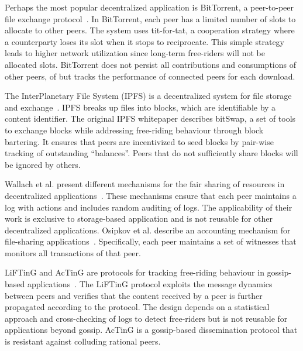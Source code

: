 Perhaps the most popular decentralized application is BitTorrent, a peer-to-peer file exchange protocol~\cite{cohen2003incentives}.
In BitTorrent, each peer has a limited number of slots to allocate to other peers.
The system uses tit-for-tat, a cooperation strategy where a counterparty loses its slot when it stops to reciprocate.
This simple strategy leads to higher network utilization since long-term free-riders will not be allocated slots.
BitTorrent does not persist all contributions and consumptions of other peers, of but tracks the performance of connected peers for each download.

The InterPlanetary File System (IPFS) is a decentralized system for file storage and exchange~\cite{benet2014ipfs}.
IPFS breaks up files into blocks, which are identifiable by a content identifier.
The original IPFS whitepaper describes bitSwap, a set of tools to exchange blocks while addressing free-riding behaviour through block bartering.
It ensures that peers are incentivized to seed blocks by pair-wise tracking of outstanding \enquote{balances}.
Peers that do not sufficiently share blocks will be ignored by others.

Wallach et al. present different mechanisms for the fair sharing of resources in decentralized applications~\cite{wallach2003enforcing}.
These mechanisms ensure that each peer maintains a log with actions and includes random auditing of logs.
The applicability of their work is exclusive to storage-based application and is not reusable for other decentralized applications.
Osipkov et al. describe an accounting mechanism for file-sharing applications~\cite{osipkov2006robust}.
Specifically, each peer maintains a set of witnesses that monitors all transactions of that peer.

LiFTinG and AcTinG are protocols for tracking free-riding behaviour in gossip-based applications~\cite{guerraoui2010lifting,mokhtar2014acting}.
The LiFTinG protocol exploits the message dynamics between peers and verifies that the content received by a peer is further propagated according to the protocol.
The design depends on a statistical approach and cross-checking of logs to detect free-riders but is not reusable for applications beyond gossip.
AcTinG is a gossip-based dissemination protocol that is resistant against colluding rational peers.

